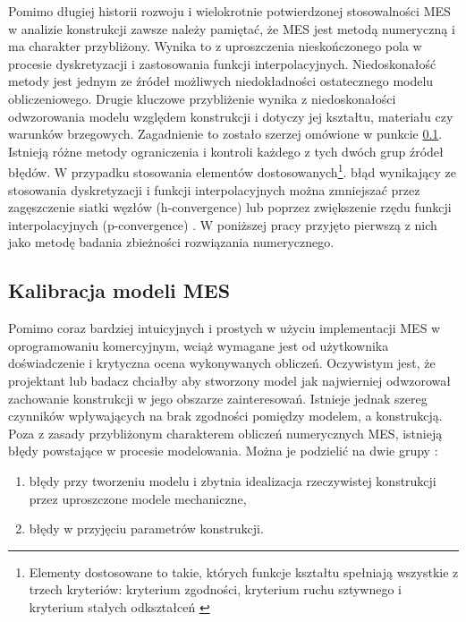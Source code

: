 Pomimo długiej historii rozwoju i wielokrotnie potwierdzonej stosowalności MES w analizie konstrukcji zawsze należy pamiętać, że MES jest metodą numeryczną i ma charakter przybliżony. Wynika to z uproszczenia nieskończonego pola w procesie dyskretyzacji i zastosowania funkcji interpolacyjnych. Niedoskonałość metody jest jednym ze źródeł możliwych niedokładności ostatecznego modelu obliczeniowego. Drugie kluczowe przybliżenie wynika z niedoskonałości odwzorowania modelu względem konstrukcji i dotyczy jej kształtu, materiału czy warunków brzegowych. Zagadnienie to zostało szerzej omówione w punkcie \ref{sect:calibration_model}. Istnieją różne metody ograniczenia i kontroli każdego z tych dwóch grup źródeł błędów. W przypadku stosowania elementów dostosowanych\footnote{
	Elementy dostosowane to takie, których funkcje kształtu spełniają wszystkie z trzech kryteriów: kryterium zgodności, kryterium ruchu sztywnego i kryterium stałych odkształceń \parencite{Rakowski2016}}.
błąd wynikający ze stosowania dyskretyzacji i funkcji interpolacyjnych można zmniejszać przez zagęszczenie siatki węzłów (h-convergence) lub poprzez zwiększenie rzędu funkcji interpolacyjnych (p-convergence) \parencite{Zienkiewicz2005}. W poniższej pracy przyjęto pierwszą z nich jako metodę badania zbieżności rozwiązania numerycznego.

\subsection{Kalibracja modeli MES} \label{sect:calibration_model}
Pomimo coraz bardziej intuicyjnych i prostych w użyciu implementacji MES w oprogramowaniu komercyjnym, wciąż wymagane jest od użytkownika doświadczenie i krytyczna ocena wykonywanych obliczeń. Oczywistym jest, że projektant lub badacz chciałby aby stworzony model jak najwierniej odwzorował zachowanie konstrukcji w jego obszarze zainteresowań. Istnieje jednak szereg czynników wpływających na brak zgodności pomiędzy modelem, a konstrukcją. Poza z zasady przybliżonym charakterem obliczeń numerycznych MES, istnieją błędy powstające w procesie modelowania. Można je podzielić na dwie grupy \parencite{Mottershead1993,Mottershead2011}:
\begin{enumerate}
	\item błędy przy tworzeniu modelu i zbytnia idealizacja rzeczywistej konstrukcji przez uproszczone modele mechaniczne,
	\item błędy w przyjęciu parametrów konstrukcji.
\end{enumerate}


